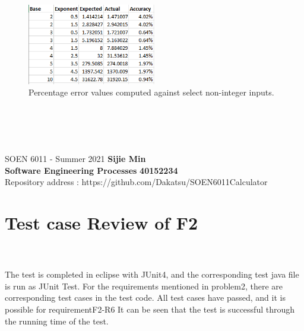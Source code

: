 \documentclass[letterpaper, 11pt]{report}
\begin{document}
\begin{figure}[htb]
\includegraphics[width=0.5\textwidth]{ErrorF7}
\centering
\caption{Percentage error values computed against select non-integer inputs.}
\end{figure} \\\\

\pagebreak

\section*{}
\normalsize {SOEN 6011 - Summer 2021} \hfill \textbf{Sijie Min} \\
\textbf{ Software Engineering Processes}  \hfill \textbf{40152234} \\
\hfill Repository address : https://github.com/Dakatsu/SOEN6011Calculator
\\
\section*{Test case Review of F2}

\\\\The test is completed in eclipse with JUnit4, and the corresponding test java file is run as JUnit Test. For the requirements mentioned in problem2, there are corresponding test cases in the test code. All test cases have passed, and it is possible for requirementF2-R6 It can be seen that the test is successful through the running time of the test.
\end{document}
